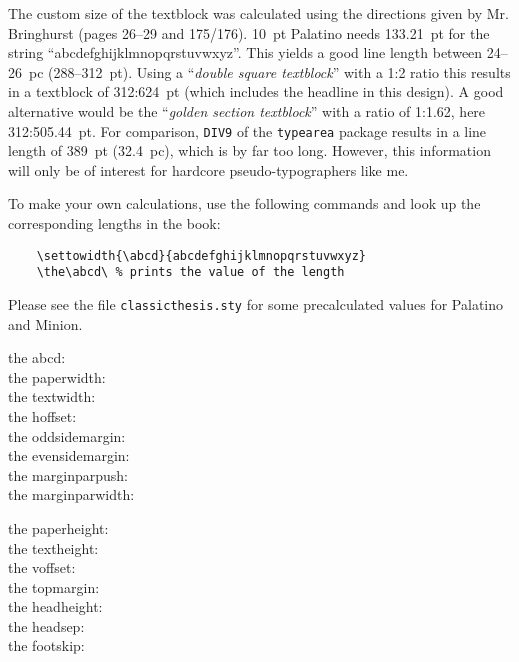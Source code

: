 The custom size of the textblock was calculated
using the directions given by Mr. Bringhurst (pages 26--29 and
175/176). 10~pt Palatino needs  133.21~pt for the string
``abcdefghijklmnopqrstuvwxyz''. This yields a good line length between
24--26~pc (288--312~pt). Using a ``\emph{double square textblock}''
with a 1:2 ratio this results in a textblock of 312:624~pt (which
includes the headline in this design). A good alternative would be the
``\emph{golden section textblock}'' with a ratio of 1:1.62, here
312:505.44~pt. For comparison, \texttt{DIV9} of the \texttt{typearea}
package results in a line length of 389~pt (32.4~pc), which is by far
too long. However, this information will only be of interest for
hardcore pseudo-typographers like me.%

To make your own calculations, use the following commands and look up
the corresponding lengths in the book:
\begin{verbatim}
    \settowidth{\abcd}{abcdefghijklmnopqrstuvwxyz}
    \the\abcd\ % prints the value of the length
\end{verbatim}
Please see the file \texttt{classicthesis.sty} for some precalculated 
values for Palatino and Minion.

    \settowidth{\abcd}{abcdefghijklmnopqrstuvwxyz}
    the abcd: \the\abcd\ %
\\  the paperwidth: \the\paperwidth
\\  the textwidth: \the\textwidth
\\  the hoffset: \the\hoffset
\\  the oddsidemargin: \the\oddsidemargin
\\  the evensidemargin: \the\evensidemargin
\\  the marginparpush: \the\marginparpush
\\  the marginparwidth: \the\marginparwidth

    the paperheight: \the\paperheight
\\  the textheight: \the\textheight
\\  the voffset: \the\voffset
\\  the topmargin: \the\topmargin
\\  the headheight: \the\headheight
\\  the headsep: \the\headsep
\\  the footskip: \the\footskip
